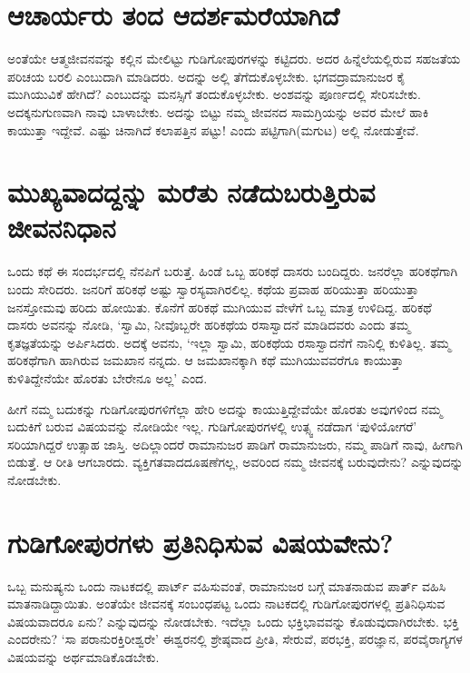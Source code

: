 \section*{ಆಚಾರ್ಯರು ತಂದ ಆದರ್ಶಮರೆಯಾಗಿದೆ}

ಅಂತೆಯೇ ಆತ್ಮಜೀವನವನ್ನು ಕಲ್ಲಿನ ಮೇಲಿಟ್ಟು ಗುಡಿಗೋಪುರಗಳನ್ನು ಕಟ್ಟಿದರು. ಅದರ ಹಿನ್ನೆಲೆಯಲ್ಲಿರುವ ಸಹಜತೆಯ ಪರಿಚಯ ಬರಲಿ ಎಂಬುದಾಗಿ ಮಾಡಿದರು. ಅದನ್ನು ಅಲ್ಲಿ ತೆಗೆದುಕೊಳ್ಳಬೇಕು. ಭಗವದ್ರಾಮಾನುಜರ ಕೈ ಮುಗಿಯುವಿಕೆ ಹೇಗಿದೆ? ಎಂಬುದನ್ನು ಮನಸ್ಸಿಗೆ ತಂದುಕೊಳ್ಳಬೇಕು. ಅಂಶವನ್ನು ಪೂರ್ಣದಲ್ಲಿ ಸೇರಿಸಬೇಕು. ಅದಕ್ಕನುಗುಣವಾಗಿ ನಾವು ಬಾಳಾಬೇಕು. ಅದನ್ನು ಬಿಟ್ಟು ನಮ್ಮ ಜೀವನದ ಸಾಮಗ್ರಿಯನ್ನು ಅವರ ಮೇಲೆ ಹಾಕಿ ಕಾಯುತ್ತಾ ಇದ್ದೇವೆ. ಎಷ್ಟು ಚಿನಾಗಿದೆ ಕಲಾಪತ್ತಿನ ಪಟ್ಟು! ಎಂದು ಪಟ್ಟಿಗಾಗಿ(ಮಗುಟ) ಅಲ್ಲಿ ನೋಡುತ್ತೇವೆ. 

\section*{ಮುಖ್ಯವಾದದ್ದನ್ನು ಮರೆತು ನಡೆದುಬರುತ್ತಿರುವ ಜೀವನನಿಧಾನ}

ಒಂದು ಕಥೆ ಈ ಸಂದರ್ಭದಲ್ಲಿ ನೆನಪಿಗೆ ಬರುತ್ತೆ. ಹಿಂಡೆ ಒಬ್ಬ ಹರಿಕಥೆ ದಾಸರು ಬಂದಿದ್ದರು. ಜನರೆಲ್ಲಾ ಹರಿಕಥೆಗಾಗಿ ಬಂದು ಸೇರಿದರು. ಜನರಿಗೆ ಹರಿಕಥೆ ಅಷ್ಟು  ಸ್ವಾರಸ್ಯವಾಗಿರಲಿಲ್ಲ. ಕಥೆಯ ಪ್ರವಾಹ ಹರಿಯುತ್ತಾ ಹರಿಯುತ್ತಾ ಜನಸ್ತೋಮವು ಹರಿದು ಹೋಯಿತು. ಕೊನೆಗೆ ಹರಿಕಥೆ ಮುಗಿಯುವ ವೇಳೆಗೆ ಒಬ್ಬ ಮಾತ್ರ ಉಳಿದಿದ್ದ. ಹರಿಕಥೆ ದಾಸರು ಅವನನ್ನು ನೋಡಿ, `ಸ್ವಾಮಿ, ನೀವೊಬ್ಬರೇ ಹರಿಕಥೆಯ ರಸಾಸ್ವಾದನೆ ಮಾಡಿದವರು ಎಂದು ತಮ್ಮ ಕೃತಜ್ಞತೆಯನ್ನು ಅರ್ಪಿಸಿದರು. ಅದಕ್ಕೆ ಅವನು, `ಇಲ್ಲಾ ಸ್ವಾಮಿ, ಹರಿಕಥೆಯ ರಸಾಸ್ವಾದನೆಗೆ ನಾನಿಲ್ಲಿ ಕುಳಿತಿಲ್ಲ. ತಮ್ಮ ಹರಿಕಥೆಗಾಗಿ ಹಾಗಿರುವ ಜಮಖಾನ ನನ್ನದು. ಆ ಜಮಖಾನಕ್ಕಾಗಿ ಕಥೆ ಮುಗಿಯುವವರೆಗೂ ಕಾಯುತ್ತಾ ಕುಳಿತಿದ್ದೇನೆಯೇ ಹೊರತು ಬೇರೇನೂ ಅಲ್ಲ' ಎಂದ.

ಹೀಗೆ ನಮ್ಮ ಬದುಕನ್ನು ಗುಡಿಗೋಪುರಗಳಿಗೆಲ್ಲಾ ಹೇರಿ ಅದನ್ನು ಕಾಯುತ್ತಿದ್ದೇವೆಯೇ ಹೊರತು ಅವುಗಳಿಂದ ನಮ್ಮ ಬದುಕಿಗೆ ಬರುವ ವಿಷಯವನ್ನು ನೋಡಿಯೇ ಇಲ್ಲ. ಗುಡಿಗೋಪುರಗಳಲ್ಲಿ ಉತ್ಸ್ವ ನಡೆದಾಗ `ಪುಳಿಯೋಗರೆ' ಸರಿಯಾಗಿದ್ದರೆ ಉತ್ಸಾಹ ಜಾಸ್ತಿ. ಅದಿಲ್ಲಾಂದರೆ ರಾಮಾನುಜರ ಪಾಡಿಗೆ ರಾಮಾನುಜರು, ನಮ್ಮ ಪಾಡಿಗೆ ನಾವು, ಹೀಗಾಗಿ ಬಿಡುತ್ತೆ. ಆ ರೀತಿ ಆಗಬಾರದು. ವ್ಯಕ್ತಿಗತವಾದದೂಷಣೆಗಲ್ಲ, ಅವರಿಂದ ನಮ್ಮ ಜೀವನಕ್ಕೆ ಬರುವುದೇನು? ಎನ್ನುವುದನ್ನು ನೋಡಬೇಕು.

\section*{ಗುಡಿಗೋಪುರಗಳು ಪ್ರತಿನಿಧಿಸುವ ವಿಷಯವೇನು?}

ಒಬ್ಬ ಮನುಷ್ಯನು ಒಂದು ನಾಟಕದಲ್ಲಿ ಪಾರ್ಟ್ ವಹಿಸುವಂತೆ, ರಾಮಾನುಜರ ಬಗ್ಗೆ ಮಾತನಾಡುವ ಪಾರ್ತ್ ವಹಿಸಿ ಮಾತನಾಡಿದ್ದಾಯಿತು. ಅಂತೆಯೇ ಜೀವನಕ್ಕೆ ಸಂಬಂಧಪಟ್ಟ ಒಂದು ನಾಟಕದಲ್ಲಿ ಗುಡಿಗೋಪುರಗಳಲ್ಲಿ ಪ್ರತಿನಿಧಿಸುವ ವಿಷಯವಾದರೂ ಏನು? ಎನ್ನುವುದನ್ನು ನೋಡಬೇಕು. ಇದೆಲ್ಲಾ ಒಂದು ಭಕ್ತಿಭಾವವನ್ನು  ಕೊಡುವುದಾಗಿರಬೇಕು. ಭಕ್ತಿ ಎಂದರೇನು? `ಸಾ ಪರಾನುರಕ್ತಿರೀಶ್ವರೇ' ಈಶ್ವರನಲ್ಲಿ ಶ್ರೇಷ್ಠವಾದ ಪ್ರೀತಿ, ಸೇರುವೆ, ಪರಭಕ್ತಿ, ಪರಜ್ಞಾನ, ಪರವೈರಾಗ್ಯಗಳ ವಿಷಯವನ್ನು ಅರ್ಥಮಾಡಿಕೊಡಬೇಕು.


